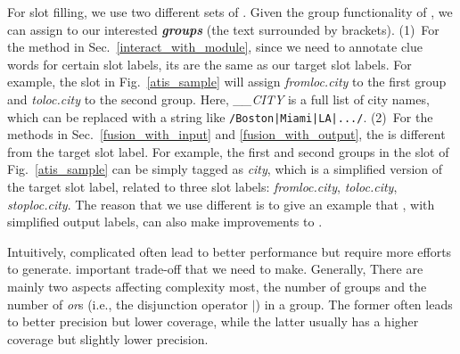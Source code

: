 For slot filling, we use two different sets of \REs. Given the group functionality of \RE, we can assign \REtags to our interested
\textbf{\emph{\RE groups}} (the text surrounded by brackets). (1)~For the method in Sec.~\ref{interact_with_module}, since we need to
annotate clue words for certain slot labels, its \REtags are the same as our target slot labels.
For example, the slot \RE in Fig.~\ref{atis_sample} will assign \emph{fromloc.city} to the first \RE group and \emph{toloc.city} to the second group.
Here, \emph{\_\_CITY} is a full list of city names, which can be replaced with a string like \texttt{/Boston|Miami|LA|.../}.
(2)~For the methods in Sec.~\ref{fusion_with_input} and \ref{fusion_with_output}, the
\REtag is different from the target slot label.
For example, the first and second \RE groups in the slot \RE of Fig.~\ref{atis_sample} can be simply tagged as \emph{city},
which is a simplified version of the target slot label, related to three slot labels: \emph{fromloc.city}, \emph{toloc.city}, \emph{stoploc.city}.
The reason that we use different \REs is to give an example that \REs,
with simplified output labels, can also make improvements to \NN.


Intuitively, complicated \REs often lead to better performance but require more efforts to generate. %
important trade-off that we need to make. Generally, There are mainly two aspects affecting \RE complexity most, the number of \RE groups
and the number of \emph{or}s (i.e., the disjunction operator $|$) in a \RE group. The former often leads to better precision but lower
coverage, while the latter usually has a higher coverage but slightly lower precision.



